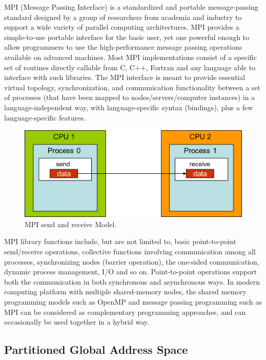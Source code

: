 MPI (Message Passing Interface) \cite{gropp1999using} is a standardized and portable message-passing standard designed by a group of researchers from academia and industry to support a wide variety of parallel computing architectures. MPI provides a simple-to-use portable interface for the basic user, yet one powerful enough to allow programmers to use the high-performance message passing operations available on advanced machines. Most MPI implementations consist of a specific set of routines directly callable from C, C++, Fortran and any language able to interface with such libraries. The MPI interface is meant to provide essential virtual topology, synchronization, and communication functionality between a set of processes (that have been mapped to nodes/servers/computer instances) in a language-independent way, with language-specific syntax (bindings), plus a few language-specific features. 

\begin{figure}[htbp]
	\centering
	\includegraphics[width=5.4in]{fig/mpi_send_recv.jpg}
	\caption{MPI send and receive Model.}
	\label{mpi_model}
\end{figure}

MPI library functions include, but are not limited to, basic point-to-point send/receive operations, collective functions involving communication among all processes, synchronizing nodes (barrier operation), the one-sided communication, dynamic process management, I/O and so on. Point-to-point operations support both the communication in both synchronous and asynchronous ways. In modern computing platform with multiple shared-memory nodes, the shared memory programming models such as OpenMP and message passing programming such as MPI can be considered as complementary programming approaches, and can occasionally be used together in a hybrid way.

\subsection{Partitioned Global Address Space}

